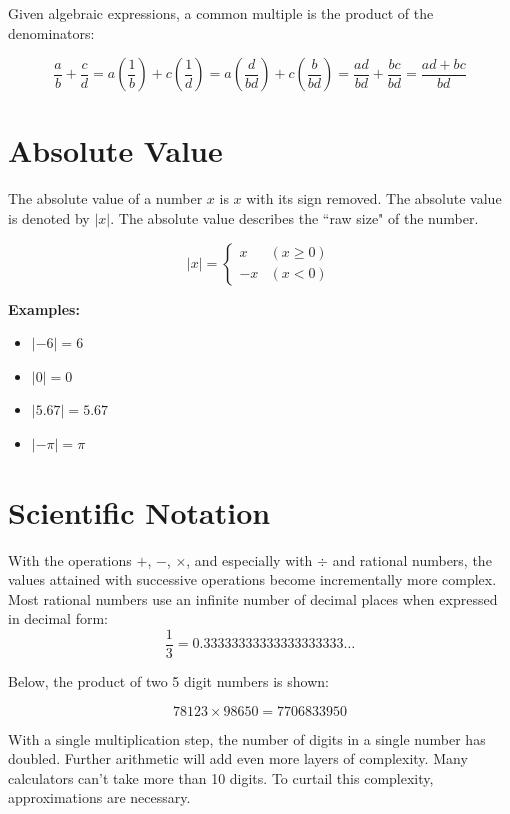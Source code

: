 \documentclass{article}
\begin{document}
Given algebraic expressions, a common multiple is the product of the denominators:

\[\frac{a}{b} + \frac{c}{d} = a(\frac{1}{b}) + c(\frac{1}{d}) = a(\frac{d}{bd}) + c(\frac{b}{bd}) = \frac{ad}{bd} + \frac{bc}{bd} = \frac{ad + bc}{bd}\]





\section{Absolute Value}

The absolute value of a number \(x\) is \(x\) with its sign removed. The absolute value is denoted by \(|x|\). The absolute value describes the ``raw size" of the number.

\[|x| = \left\{\begin{array}{cc} x & (x \geq 0) \\ -x & (x < 0) \end{array}\right.\]

\textbf{Examples:}
\begin{itemize}
\item \(|-6| = 6\)
\item \(|0| = 0\)
\item \(|5.67| = 5.67\)
\item \(|-\pi| = \pi\)
\end{itemize}



\section{Scientific Notation}

With the operations \(+\), \(-\), \(\times\), and especially with \(\div\) and rational numbers, the values attained with successive operations become incrementally more complex. Most rational numbers use an infinite number of decimal places when expressed in decimal form:
\[\frac{1}{3} = 0.33333333333333333333\dots\]

%
%

Below, the product of two 5 digit numbers is shown: 

\[78123 \times 98650 = 7706833950\]

With a single multiplication step, the number of digits in a single number has doubled. Further arithmetic will add even more layers of complexity. Many calculators can't take more than 10 digits. To curtail this complexity, approximations are necessary. 
\end{document}
